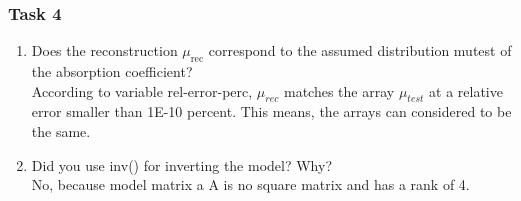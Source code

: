 \subsubsection*{Task 4}
\begin{enumerate}[label=(\alph*)]
    \item Does the reconstruction $\mu_\text{rec}$ correspond to the assumed distribution mutest of the absorption coefficient?\\
    According to variable rel-error-perc, $\mu_{rec}$ matches the array $\mu_{test}$ at a relative error smaller than 1E-10 percent. This means, the arrays can considered to be the same.
    \item Did you use inv() for inverting the model? Why?\\
     No, because model matrix a A is no square matrix and has a rank of 4.
\end{enumerate}
